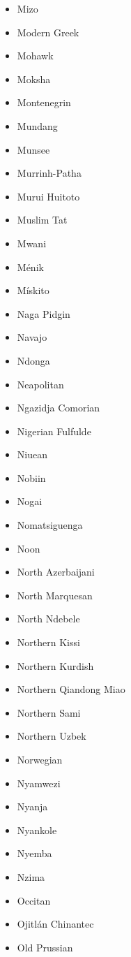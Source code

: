 \documentclass[paper=a4, 12pt]{scrbook}
\begin{document}
\begin{multicols}{3}
\begin{itemize}
        \item Mizo
        \item Modern Greek
        \item Mohawk
        \item Moksha
        \item Montenegrin
        \item Mundang
        \item Munsee
        \item Murrinh-Patha
        \item Murui Huitoto
        \item Muslim Tat
        \item Mwani
        \item Ménik
        \item Mískito
        \item Naga Pidgin
        \item Navajo
        \item Ndonga
        \item Neapolitan
        \item Ngazidja Comorian
        \item Nigerian Fulfulde
        \item Niuean
        \item Nobiin
        \item Nogai
        \item Nomatsiguenga
        \item Noon
        \item North Azerbaijani
        \item North Marquesan
        \item North Ndebele
        \item Northern Kissi
        \item Northern Kurdish
        \item Northern Qiandong Miao
        \item Northern Sami
        \item Northern Uzbek
        \item Norwegian
        \item Nyamwezi
        \item Nyanja
        \item Nyankole
        \item Nyemba
        \item Nzima
        \item Occitan
        \item Ojitlán Chinantec
        \item Old Prussian

\end{itemize}
\end{multicols}
\end{document}
